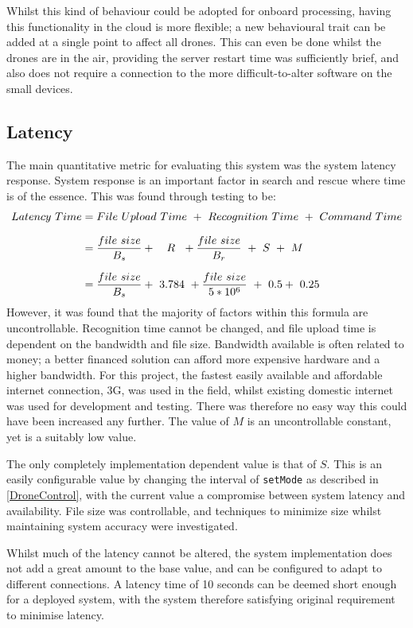 \documentclass{article}
\begin{document}
Whilst this kind of behaviour could be adopted for onboard processing, having this functionality in the cloud is more flexible; a new behavioural trait can be added at a single point to affect all drones. This can even be done whilst the drones are in the air, providing the server restart time was sufficiently brief, and also does not require a connection to the more difficult-to-alter software on the small devices.

\subsection{Latency}
The main quantitative metric for evaluating this system was the system latency response. System response is an important factor in search and rescue where time is of the essence. This was found through testing to be:
\begin{equation*}
\setlength{\jot}{10pt}
\begin{split}
Latency\ Time 	&= File\ Upload\ Time\ +\ Recognition\ Time\ +\ Command\ Time \\
				&= \frac{file\ size}{B_s} +\ \ \ R\ \ + \frac{file\ size}{B_r}\ +\ S\  +\ M \\
				&= \frac{file\ size}{B_s} +\ 3.784\ + \frac{file\ size}{5*10^6}\ +\ 0.5 +\ 0.25 
\end{split}
\end{equation*}
However, it was found that the majority of factors within this formula are uncontrollable. Recognition time cannot be changed, and file upload time is dependent on the bandwidth and file size. Bandwidth available is often related to money; a better financed solution can afford more expensive hardware and a higher bandwidth. For this project, the fastest easily available and affordable internet connection, 3G, was used in the field, whilst existing domestic internet was used for development and testing. There was therefore no easy way this could have been increased any further. The value of $M$ is an uncontrollable constant, yet is a suitably low value. 

The only completely implementation dependent value is that of $S$. This is an easily configurable value by changing the interval of \texttt{setMode} as described in \ref{DroneControl}, with the current value a compromise between system latency and availability. File size was controllable, and techniques to minimize size whilst maintaining system accuracy were investigated. 

Whilst much of the latency cannot be altered, the system implementation does not add a great amount to the base value, and can be configured to adapt to different connections. A latency time of 10 seconds can be deemed short enough for a deployed system, with the system therefore satisfying original requirement to minimise latency. 
\end{document}
